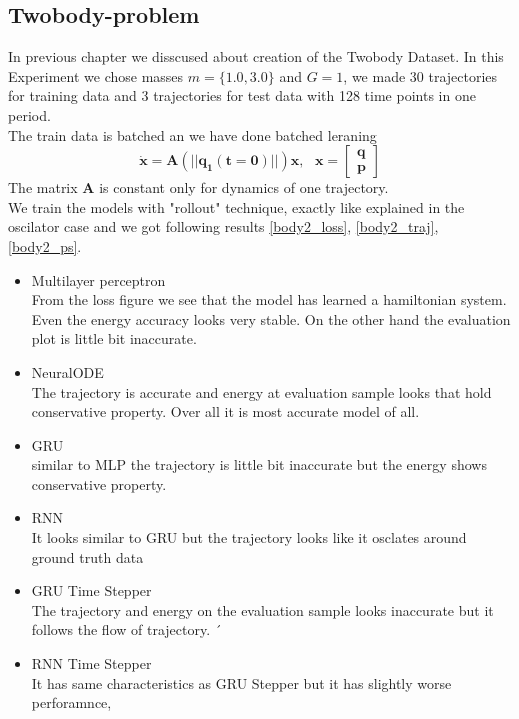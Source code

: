\subsection{Twobody-problem}
In previous chapter we disscused about creation of the Twobody Dataset.
In this Experiment we chose masses $m=\{1.0,3.0\}$ and $G=1$, we made 30 trajectories for training data and 3 trajectories for test data with 128 time points in one period.\\
The train data is batched an we have done batched leraning\begin{equation}
	\dot{\mathbf{x}} = \mathbf{A}(||\mathbf{q_1(t=0)}||)\mathbf{x},\text{  }\mathbf{x} = \begin{bmatrix}
		\mathbf{q}\\
		\mathbf{p}
	\end{bmatrix}
\end{equation} The matrix $\mathbf{A}$ is constant only for dynamics of one trajectory.\\
We train the models with "rollout" technique, exactly like explained in the oscilator case and we got following results \ref{body2_loss}, \ref{body2_traj}, \ref{body2_ps}.
\begin{itemize}
	\item Multilayer perceptron\\
	From the loss figure we see that the model has learned a hamiltonian system. Even the energy accuracy looks very stable. On the other hand the evaluation plot is little bit inaccurate.
	
	
	\item NeuralODE\\
	The trajectory is accurate and energy at evaluation sample looks that hold conservative property. Over all it is most accurate model of all.
	
	
	\item GRU\\
	similar to MLP the trajectory is little bit inaccurate but the energy shows conservative property.
	
	\item RNN\\
	It looks similar to GRU but the trajectory looks like it osclates around ground truth data 

	\item GRU Time Stepper\\
	The trajectory and energy on the evaluation sample looks inaccurate but it follows the flow of trajectory. ´

	\item RNN Time Stepper\\
	It has same characteristics as GRU Stepper but it has slightly worse perforamnce,
	
\end{itemize}

